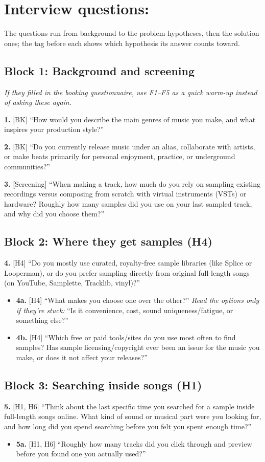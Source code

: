 \documentclass[12pt,a4paper]{report}
\begin{document}
\section{Interview questions:}
The questions run from background to the problem hypotheses, then the solution ones; the tag before each shows which hypothesis its answer counts toward.

\subsection{Block 1: Background and screening}
\emph{If they filled in the booking questionnaire, use F1–F5 as a quick warm-up instead of asking these again.}

\textbf{1.} [BK] “How would you describe the main genres of music you make, and what inspires your production style?”

\textbf{2.} [BK] “Do you currently release music under an alias, collaborate with artists, or make beats primarily for personal enjoyment, practice, or underground communities?”

\textbf{3.} [Screening] “When making a track, how much do you rely on sampling existing recordings versus composing from scratch with virtual instruments (VSTs) or hardware? Roughly how many samples did you use on your last sampled track, and why did you choose them?”

\subsection{Block 2: Where they get samples (H4)}
\textbf{4.} [H4] “Do you mostly use curated, royalty-free sample libraries (like Splice or Looperman), or do you prefer sampling directly from original full-length songs (on YouTube, Samplette, Tracklib, vinyl)?”
\begin{itemize}[itemsep=2pt]
\item \textbf{4a.} [H4] “What makes you choose one over the other?” \emph{Read the options only if they’re stuck:} “Is it convenience, cost, sound uniqueness/fatigue, or something else?”
\item \textbf{4b.} [H4] “Which free or paid tools/sites do you use most often to find samples? Has sample licensing/copyright ever been an issue for the music you make, or does it not affect your releases?”
\end{itemize}

\subsection{Block 3: Searching inside songs (H1)}
\textbf{5.} [H1, H6] “Think about the last specific time you searched for a sample inside full-length songs online. What kind of sound or musical part were you looking for, and how long did you spend searching before you felt you spent enough time?”
\begin{itemize}[itemsep=2pt]
\item \textbf{5a.} [H1, H6] “Roughly how many tracks did you click through and preview before you found one you actually used?”
\end{itemize}
\end{document}
